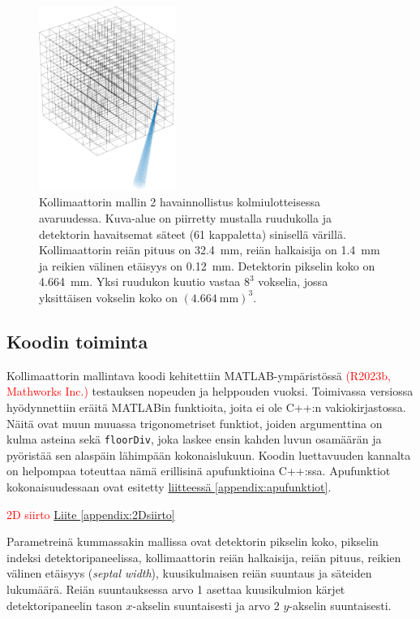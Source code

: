 \begin{figure}[H]
    \centering
    \captionsetup{width=.9\textwidth}
    \includegraphics[height=6cm]{kuvat/3d-kollimaattori2.pdf}
    \caption{Kollimaattorin mallin 2 havainnollistus kolmiulotteisessa avaruudessa. Kuva-alue on piirretty mustalla ruudukolla ja detektorin havaitsemat säteet (61 kappaletta) sinisellä värillä. Kollimaattorin reiän pituus on \qty{32.4}{\milli\meter}, reiän halkaisija on \qty{1.4}{\milli\meter} ja reikien välinen etäisyys on \qty{0.12}{\milli\meter}. Detektorin pikselin koko on \qty{4.664}{\milli\meter}. Yksi ruudukon kuutio vastaa $8^3$ vokselia, jossa yksittäisen vokselin koko on $(\qty{4.664}{\milli\meter})^{3}$.}
    \label{fig:ray3}
\end{figure}

\subsection{Koodin toiminta}
Kollimaattorin mallintava koodi kehitettiin MATLAB-ympäristössä \textcolor{red}{(R2023b, Mathworks Inc.)} testauksen nopeuden ja helppouden vuoksi. Toimivassa versiossa hyödynnettiin eräitä MATLABin funktioita, joita ei ole C++:n vakiokirjastossa. Näitä ovat muun muuassa trigonometriset funktiot, joiden argumenttina on kulma asteina sekä \texttt{floorDiv}, joka laskee ensin kahden luvun osamäärän ja pyöristää sen alaspäin lähimpään kokonaislukuun. Koodin luettavuuden kannalta on helpompaa toteuttaa nämä erillisinä apufunktioina C++:ssa. Apufunktiot kokonaisuudessaan ovat esitetty \hyperref[appendix:apufunktiot]{liitteessä \ref*{appendix:apufunktiot}}.

\textcolor{red}{2D siirto \hyperref[appendix:2Dsiirto]{Liite \ref*{appendix:2Dsiirto}}}

Parametreinä kummassakin mallissa ovat detektorin pikselin koko, pikselin indeksi detektoripaneelissa, kollimaattorin reiän halkaisija, reiän pituus, reikien välinen etäisyys (\textit{septal width}), kuusikulmaisen reiän suuntaus ja säteiden lukumäärä. Reiän suuntauksessa arvo 1 asettaa kuusikulmion kärjet detektoripaneelin tason $x$-akselin suuntaisesti ja arvo 2 $y$-akselin suuntaisesti.

